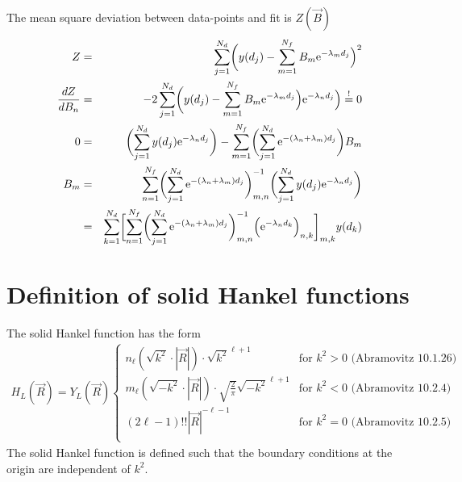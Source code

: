 \documentclass[11pt,a4paper]{report}
\begin{document}
The mean square deviation between data-points and fit is $Z(\vec{B})$
\begin{eqnarray}
Z&=&\sum_{j=1}^{N_d} \biggl( y(d_j)-\sum_{m=1}^{N_f}B_m\mathrm{e}^{-\lambda_m d_j}\Bigr)^2
\nonumber\\
\frac{dZ}{dB_n}&=&
-2\sum_{j=1}^{N_d} \biggl( y(d_j)-\sum_{m=1}^{N_f}B_m\mathrm{e}^{-\lambda_m d_j}\Bigr)
\mathrm{e}^{-\lambda_n d_j}\Bigr)\stackrel{!}{=}0
\nonumber\\
0&=&
\biggl(\sum_{j=1}^{N_d} y(d_j) \mathrm{e}^{-\lambda_n d_j}\biggr)
-
\sum_{m=1}^{N_f}
\biggl(\sum_{j=1}^{N_d} \mathrm{e}^{-(\lambda_n+\lambda_m) d_j}\biggr)B_m
\nonumber\\
B_m&=&\sum_{n=1}^{N_f}
\biggl(\sum_{j=1}^{N_d} \mathrm{e}^{-(\lambda_n+\lambda_m) d_j}\biggr)^{-1}_{m,n}
\biggl(\sum_{j=1}^{N_d} y(d_j) \mathrm{e}^{-\lambda_n d_j}\biggr)
\nonumber\\
&=&
\sum_{k=1}^{N_d} 
\biggl[
\sum_{n=1}^{N_f}
\biggl(\sum_{j=1}^{N_d} \mathrm{e}^{-(\lambda_n+\lambda_m) d_j}\biggr)^{-1}_{m,n}
\Bigl(\mathrm{e}^{-\lambda_n d_k}\Bigr)_{n,k}\biggr]_{m,k}
y(d_k) 
\end{eqnarray}



\appendix
\chapter{Definition of solid Hankel functions}
\label{app:solidhankel}
The solid Hankel function has the form
\begin{eqnarray}
H_L(\vec{R})=Y_L(\vec{R})
\begin{cases}
n_\ell(\sqrt{k^2}\cdot|\vec{R}|) \cdot \sqrt{k^2}^{\ell+1}
&\text{for $k^2>0$  (Abramovitz 10.1.26)}\\
m_\ell(\sqrt{-k^2}\cdot|\vec{R}|) \cdot \sqrt{\frac{2}{\pi}} \sqrt{-k^2}^{\ell+1}
&\text{for $k^2<0$  (Abramovitz 10.2.4)}\\
(2\ell-1)!! |\vec{R}|^{-\ell-1} 
&\text{for $k^2=0$  (Abramovitz 10.2.5)}\\
\end{cases}
\end{eqnarray}
The solid Hankel function is defined such that the boundary conditions
at the origin are independent of $k^2$.
\end{document}
